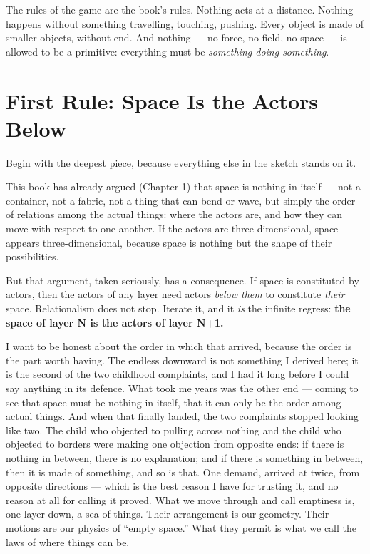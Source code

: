 \documentclass[fontsize=11pt,paper=a4,pagesize=auto,parskip=half-]{scrbook}
\begin{document}
The rules of the game are the book's rules. Nothing acts at a distance. Nothing happens without something travelling, touching, pushing. Every object is made of smaller objects, without end. And nothing --- no force, no field, no space --- is allowed to be a primitive: everything must be \emph{something doing something}.

\section{First Rule: Space Is the Actors Below}

Begin with the deepest piece, because everything else in the sketch stands on it.

This book has already argued (Chapter 1) that space is nothing in itself --- not a container, not a fabric, not a thing that can bend or wave, but simply the order of relations among the actual things: where the actors are, and how they can move with respect to one another. If the actors are three-dimensional, space appears three-dimensional, because space is nothing but the shape of their possibilities.

But that argument, taken seriously, has a consequence. If space is constituted by actors, then the actors of any layer need actors \emph{below them} to constitute \emph{their} space. Relationalism does not stop. Iterate it, and it \emph{is} the infinite regress: \textbf{the space of layer N is the actors of layer N+1.}

I want to be honest about the order in which that arrived, because the order is the part worth having. The endless downward is not something I derived here; it is the second of the two childhood complaints, and I had it long before I could say anything in its defence. What took me years was the other end --- coming to see that space must be nothing in itself, that it can only be the order among actual things. And when that finally landed, the two complaints stopped looking like two. The child who objected to pulling across nothing and the child who objected to borders were making one objection from opposite ends: if there is nothing in between, there is no explanation; and if there is something in between, then it is made of something, and so is that. One demand, arrived at twice, from opposite directions --- which is the best reason I have for trusting it, and no reason at all for calling it proved. What we move through and call emptiness is, one layer down, a sea of things. Their arrangement is our geometry. Their motions are our physics of ``empty space.'' What they permit is what we call the laws of where things can be.
\end{document}

